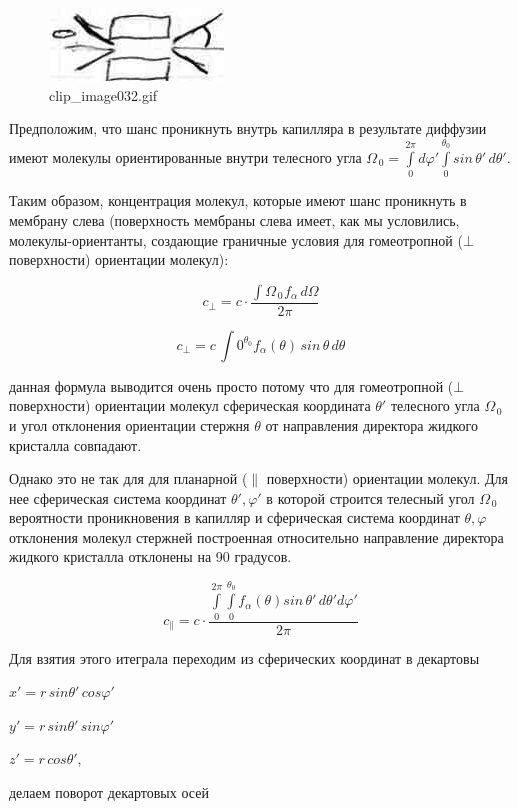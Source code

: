 \documentclass[11pt]{article}
\begin{document}
    \begin{figure}
\centering
\includegraphics{clip_image032.jpg}
\caption{clip\_image032.gif}
\end{figure}

Предположим, что шанс проникнуть внутрь капилляра в результате диффузии
имеют молекулы ориентированные внутри телесного угла
\(\Omega_{\,0} = \int \limits_{0}^{2 \pi}d\varphi'\int\limits_{0}^{\theta_{0}}sin\,\theta'\,d\theta'\).

    Таким образом, концентрация молекул, которые имеют шанс проникнуть в
мембрану слева (поверхность мембраны слева имеет, как мы условились,
молекулы-ориентанты, создающие граничные условия для гомеотропной
(\(\bot\) поверхности) ориентации молекул):


\[c_{\bot}=c\cdot\frac{\int \limits{\Omega_{\,0}}^{}f_{\alpha}\,d\Omega}{2\pi}\]

\[c_{\bot}=c\,\int \limits{0}^{\theta_{0}}f_{\alpha}\left(\theta\right)\,sin\,\theta\,d\theta\]

данная формула выводится очень просто потому что для гомеотропной
(\(\bot\) поверхности) ориентации молекул сферическая координата
\(\theta'\) телесного угла \(\Omega_{\,0}\) и угол отклонения ориентации
стержня \(\theta\) от направления директора жидкого кристалла совпадают.

Однако это не так для для планарной (\(\parallel\) поверхности)
ориентации молекул. Для нее сферическая система координат
\(\theta', \varphi'\) в которой строится телесный угол \(\Omega_{\,0}\)
вероятности проникновения в капилляр и сферическая система координат
\(\theta, \varphi\) отклонения молекул стержней построенная относительно
направление директора жидкого кристалла отклонены на 90 градусов.

\[c_{\parallel}=c\cdot\frac{\int \limits_{0}^{2 \pi}\int\limits_{0}^{\theta_{0}}f_{\alpha}\left(\theta\right)sin\,\theta'\,d\theta'd\varphi'}{2\pi}\]

Для взятия этого итеграла переходим из сферических координат в декартовы

\(x'= r\,sin \theta'\,cos \varphi'\)

\(y'= r\,sin \theta'\,sin \varphi'\)

\(z'= r\,cos \theta'\),

делаем поворот декартовых осей
\end{document}
